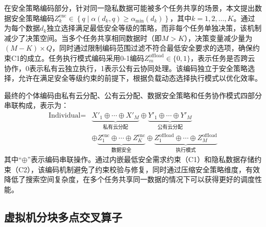 在安全策略编码部分，针对同一隐私数据可能被多个任务共享的场景，本文提出数据安全策略编码\(Z^\text{enc}_k \in \left\{ q \mid \alpha(d_k,q) \geq \alpha_{\min}(d_k) \right\}\)，其中\(k=1,2,\dots,K\)。通过为每个数据\(d_k\)独立选择满足最低安全等级的策略，而非每个任务单独决策，该机制减少了决策空间。当多个任务共享相同数据时（即\(M > K\)），决策变量减少量为\((M-K) \times Q\)，同时通过限制编码范围过滤不符合最低安全要求的选项，确保约束C1的成立。任务执行模式编码采用0-1编码\(Z^{\text{offload}}_m \in \{0,1\}\)，表示任务是否跨云协作，0表示私有云独立执行，1表示公有云协同处理。该编码独立于安全策略选择，允许在满足安全等级约束的前提下，根据负载动态选择执行模式以优化效率。

最终的个体编码由私有云分配、公有云分配、数据安全策略和任务协作模式四部分串联构成，表示为：
\begin{equation}
    \begin{aligned}
        \text{Individual} = &\underbrace{X'_1 \oplus \cdots \oplus X'_M}_\text{私有云分配} \oplus \underbrace{Y'_1 \oplus \cdots \oplus Y'_M}_\text{公有云分配} \\
        &\oplus \underbrace{Z^\text{enc}_1 \oplus \cdots \oplus Z^\text{enc}_K}_\text{数据安全} \oplus \underbrace{Z^{\text{offload}}_1 \oplus \cdots \oplus Z^{\text{offload}}_M}_\text{执行模式}
    \end{aligned}
\end{equation}
其中“\(\oplus\)”表示编码串联操作。通过内嵌最低安全需求约束（C1）和隐私数据存储约束（C2），该编码机制避免了约束校验与修复，同时通过压缩安全策略维度，有效降低了搜索空间复杂度，在多个任务共享同一数据的情况下可以获得更好的调度性能。

\subsection{虚拟机分块多点交叉算子}


